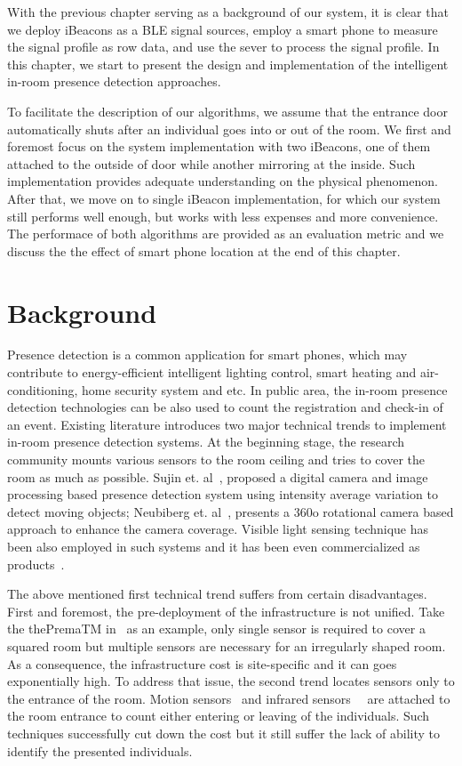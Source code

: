 \documentclass[12pt]{report}
\begin{document}
With the previous chapter serving as a background of our system, it is clear that we deploy iBeacons as a BLE signal sources, employ a smart phone to measure the signal profile as row data, and use the sever to process the signal profile. In this chapter, we start to present the design and implementation of the intelligent in-room presence detection approaches. 

To facilitate the description of our algorithms, we assume that the entrance door automatically shuts after an individual goes into or out of the room. We first and foremost focus on the system implementation with two iBeacons, one of them attached to the outside of door while another mirroring at the inside. Such implementation provides adequate understanding on the physical phenomenon. After that, we move on to single iBeacon implementation, for which our system still performs well enough, but works with less expenses and more convenience. The performace of both algorithms are provided as an evaluation metric and we discuss the the effect of smart phone location at the end of this chapter.

\section{Background}
Presence detection is a common application for smart phones, which may contribute to energy-efficient intelligent lighting control, smart heating and air-conditioning, home security system and etc. In public area, the in-room presence detection technologies can be also used to count the registration and check-in of an event. Existing literature introduces two major technical trends to implement in-room presence detection systems. At the beginning stage, the research community mounts various sensors to the room ceiling and tries to cover the room as much as possible. Sujin et. al~\cite{you}, proposed a digital camera and image processing based presence detection system using intensity average variation to detect moving objects; Neubiberg et. al~\cite{iva}, presents a 360o rotational camera based approach to enhance the camera coverage. Visible light sensing technique has been also employed in such systems and it has been even commercialized as products~\cite{premalink}. 

The above mentioned first technical trend suffers from certain disadvantages. First and foremost, the pre-deployment of the infrastructure is not unified. Take the thePremaTM in~\cite{premalink} as an example, only single sensor is required to cover a squared room but multiple sensors are necessary for an irregularly shaped room. As a consequence, the infrastructure cost is site-specific and it can goes exponentially high. To address that issue, the second trend locates sensors only to the entrance of the room. Motion sensors~\cite{yor} and infrared sensors~\cite{ben}~\cite{he} are attached to the room entrance to count either entering or leaving of the individuals. Such techniques successfully cut down the cost but it still suffer the lack of ability to identify the presented individuals. 
\end{document}
